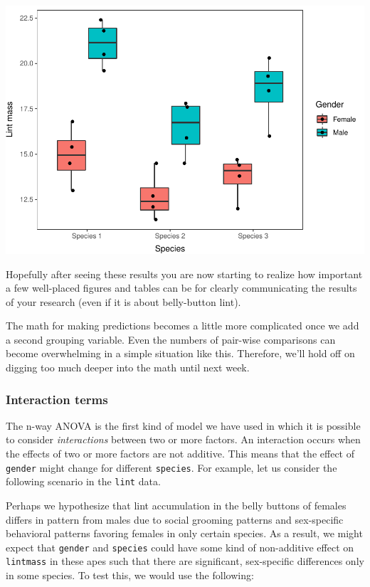 \documentclass[
]{book}
\begin{document}
\includegraphics{worstr_files/figure-latex/unnamed-chunk-197-1.pdf}

Hopefully after seeing these results you are now starting to realize how important a few well-placed figures and tables can be for clearly communicating the results of your research (even if it is about belly-button lint).

The math for making predictions becomes a little more complicated once we add a second grouping variable. Even the numbers of pair-wise comparisons can become overwhelming in a simple situation like this. Therefore, we'll hold off on digging too much deeper into the math until next week.

\hypertarget{interaction-terms}{%
\subsubsection{Interaction terms}\label{interaction-terms}}

The n-way ANOVA is the first kind of model we have used in which it is possible to consider \emph{interactions} between two or more factors. An interaction occurs when the effects of two or more factors are not additive. This means that the effect of \texttt{gender} might change for different \texttt{species}. For example, let us consider the following scenario in the \texttt{lint} data.

Perhaps we hypothesize that lint accumulation in the belly buttons of females differs in pattern from males due to social grooming patterns and sex-specific behavioral patterns favoring females in only certain species. As a result, we might expect that \texttt{gender} and \texttt{species} could have some kind of non-additive effect on \texttt{lintmass} in these apes such that there are significant, sex-specific differences only in some species. To test this, we would use the following:
\end{document}

